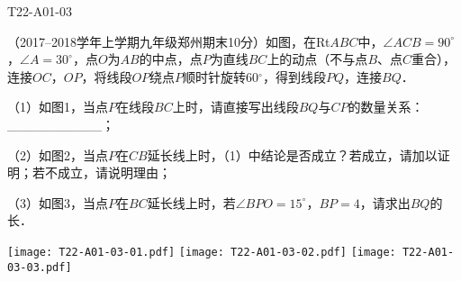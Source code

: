 \begin{defproblem}{T22-A01-03}%
\begin{onlyproblem}%
（2017--2018学年上学期九年级郑州期末10分）如图，在Rt$ABC$中，$\angle ACB=90^{\circ }$，$\angle A=30^{\circ }$，点$O$为$AB$的中点，点$P$为直线$BC$上的动点（不与点$B$、点$C$重合），连接$OC$，$OP$，将线段$OP$绕点$P$顺时针旋转60$^{\circ }$，得到线段$PQ$，连接$BQ$．

（1）如图1，当点$P$在线段$BC$上时，请直接写出线段$BQ$与$CP$的数量关系：{\_}{\_}{\_}{\_}{\_}{\_}{\_}{\_}{\_}{\_}；

（2）如图2，当点$P$在$CB$延长线上时，（1）中结论是否成立？若成立，请加以证明；若不成立，请说明理由；

（3）如图3，当点$P$在$BC$延长线上时，若$\angle BPO=15^{\circ }$，$BP=4$，请求出$BQ$的长．
\begin{center}
\texttt{[image: T22-A01-03-01.pdf]}\qquad
\texttt{[image: T22-A01-03-02.pdf]}\qquad
\texttt{[image: T22-A01-03-03.pdf]}
\end{center}

\end{onlyproblem}%
\begin{onlysolution}%
\begin{center}
\end{center}
\end{onlysolution}%
\end{defproblem}


